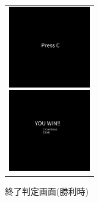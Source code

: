 \documentclass[a4paper,titlepage,11pt]{ltjsarticle}
\begin{document}
\begin{figure}[H]
\begin{center}
\begin{tabular}{c}
\begin{minipage}{0.3\hsize}
\begin{center}
\includegraphics[width=3.5cm]{start.png}
\end{center}
\caption{スタート画面}
\label{start}
\end{minipage}
\begin{minipage}{0.3\hsize}
\begin{center}
\includegraphics[width=3.5cm]{drawing_30.png}
\end{center}
\caption{終了判定画面(勝利時)}
\label{judge_end}
\end{minipage}
\end{tabular}
\end{center}
\end{figure}
\end{document}
